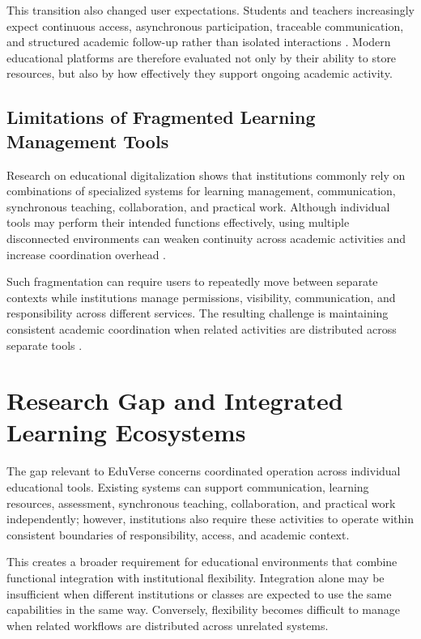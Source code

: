 This transition also changed user expectations. Students and teachers
increasingly expect continuous access, asynchronous participation, traceable
communication, and structured academic follow-up rather than isolated
interactions \cite{chugh2023edtech}. Modern educational platforms are therefore
evaluated not only by their ability to store resources, but also by how
effectively they support ongoing academic activity.

\subsection{Limitations of Fragmented Learning Management Tools}
\label{subsec:limitations_of_fragmented_learning_management_tools}

Research on educational digitalization shows that institutions commonly rely
on combinations of specialized systems for learning management, communication,
synchronous teaching, collaboration, and practical work. Although individual
tools may perform their intended functions effectively, using multiple
disconnected environments can weaken continuity across academic activities and
increase coordination overhead \cite{bygstad2022digital,oecd2023outlook}.

Such fragmentation can require users to repeatedly move between separate
contexts while institutions manage permissions, visibility, communication, and
responsibility across different services. The resulting challenge is
maintaining consistent academic coordination when related activities are
distributed across separate tools
\cite{bygstad2022digital,oecd2023outlook}.

\section{Research Gap and Integrated Learning Ecosystems}
\label{sec:research_gap_integrated_ecosystem}

The gap relevant to EduVerse concerns coordinated operation across individual
educational tools. Existing systems can support communication,
learning resources, assessment, synchronous teaching, collaboration, and
practical work independently; however, institutions also require these
activities to operate within consistent boundaries of responsibility, access,
and academic context.

This creates a broader requirement for educational environments that combine
functional integration with institutional flexibility. Integration alone may be insufficient when different institutions or classes are expected to use the same capabilities in the same way. Conversely, flexibility becomes difficult to
manage when related workflows are distributed across unrelated systems.

